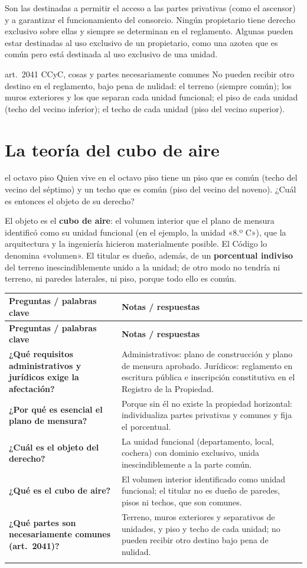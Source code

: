 \documentclass[12pt,oneside]{book}
\makeatletter
\renewcommand{\arraystretch}{1.25}
\newcommand{\cq}[2]{\textbf{#1} & #2 \\[0.45em]}
\newcommand{\cornell}[3]{%
\par\bigskip\noindent{\large\bfseries Cuadro Cornell: #1}\par\nopagebreak\smallskip
\begingroup
\small
\renewcommand{\arraystretch}{1.15}
\begin{longtable}{@{}>{\raggedright\arraybackslash}p{0.26\textwidth}>{\raggedright\arraybackslash}p{0.66\textwidth}@{}}
\toprule
\textbf{Preguntas / palabras clave} & \textbf{Notas / respuestas} \\
\midrule
\endfirsthead
\toprule
\textbf{Preguntas / palabras clave} & \textbf{Notas / respuestas} \\
\midrule
\endhead
#2
\midrule
\multicolumn{2}{@{}p{\dimexpr0.92\textwidth+2\tabcolsep\relax}@{}}{\vspace{0.2em}\textbf{Resumen.} #3\vspace{0.2em}} \\
\bottomrule
\end{longtable}
\endgroup
}
\makeatother
\begin{document}
Son las destinadas a permitir el acceso a las partes privativas (como el ascensor) y a garantizar el funcionamiento del consorcio. Ningún propietario tiene derecho exclusivo sobre ellas y siempre se determinan en el reglamento. Algunas pueden estar destinadas al uso exclusivo de un propietario, como una azotea que es común pero está destinada al uso exclusivo de una unidad.

\begin{regla}{art.~2041 CCyC, cosas y partes necesariamente comunes}
No pueden recibir otro destino en el reglamento, bajo pena de nulidad: el terreno (siempre común); los muros exteriores y los que separan cada unidad funcional; el piso de cada unidad (techo del vecino inferior); el techo de cada unidad (piso del vecino superior).
\end{regla}

\section{La teoría del cubo de aire}

\begin{ejemplo}{el octavo piso}
Quien vive en el octavo piso tiene un piso que es común (techo del vecino del séptimo) y un techo que es común (piso del vecino del noveno). ¿Cuál es entonces el objeto de su derecho?
\end{ejemplo}

El objeto es el \textbf{cubo de aire}: el volumen interior que el plano de mensura identificó como su unidad funcional (en el ejemplo, la unidad «8.º C»), que la arquitectura y la ingeniería hicieron materialmente posible. El Código lo denomina «volumen». El titular es dueño, además, de un \textbf{porcentual indiviso} del terreno inescindiblemente unido a la unidad; de otro modo no tendría ni terreno, ni paredes laterales, ni piso, porque todo ello es común. %

\cornell{afectación y estructura jurídica}{
\cq{¿Qué requisitos administrativos y jurídicos exige la afectación?}{Administrativos: plano de construcción y plano de mensura aprobado. Jurídicos: reglamento en escritura pública e inscripción constitutiva en el Registro de la Propiedad.}
\cq{¿Por qué es esencial el plano de mensura?}{Porque sin él no existe la propiedad horizontal: individualiza partes privativas y comunes y fija el porcentual.}
\cq{¿Cuál es el objeto del derecho?}{La unidad funcional (departamento, local, cochera) con dominio exclusivo, unida inescindiblemente a la parte común.}
\cq{¿Qué es el cubo de aire?}{El volumen interior identificado como unidad funcional; el titular no es dueño de paredes, pisos ni techos, que son comunes.}
\cq{¿Qué partes son necesariamente comunes (art.~2041)?}{Terreno, muros exteriores y separativos de unidades, y piso y techo de cada unidad; no pueden recibir otro destino bajo pena de nulidad.}
}{La afectación requiere plano de mensura aprobado y reglamento en escritura inscripto con efecto constitutivo. El objeto es la unidad funcional como cubo de aire con porcentual indiviso del terreno; terreno, muros, pisos y techos son necesariamente comunes.}
\end{document}
